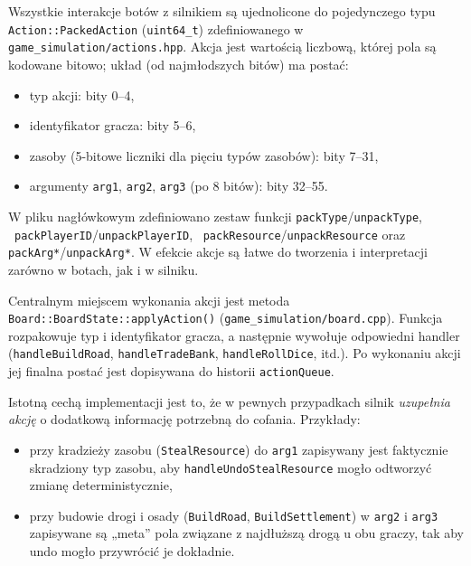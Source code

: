 \documentclass[polish,inz,longabstract]{iithesis}
\begin{document}
Wszystkie interakcje botów z silnikiem są ujednolicone do pojedynczego typu \texttt{Action::PackedAction} (\texttt{uint64\_t}) zdefiniowanego w \texttt{game\_simulation/actions.hpp}. Akcja jest wartością liczbową, której pola są kodowane bitowo; układ (od najmłodszych bitów) ma postać:

\begin{itemize}
\item typ akcji: bity 0–4,
\item identyfikator gracza: bity 5–6,
\item zasoby (5-bitowe liczniki dla pięciu typów zasobów): bity 7–31,
\item argumenty \texttt{arg1}, \texttt{arg2}, \texttt{arg3} (po 8 bitów): bity 32–55.
\end{itemize}

W pliku nagłówkowym zdefiniowano zestaw funkcji \texttt{packType}/\texttt{unpackType}, \ \newline \texttt{packPlayerID}/\texttt{unpackPlayerID}, \ \texttt{packResource}/\texttt{unpackResource} oraz \newline \texttt{packArg*}/\texttt{unpackArg*}. W efekcie akcje są łatwe do tworzenia i interpretacji zarówno w botach, jak i w silniku.

Centralnym miejscem wykonania akcji jest metoda \newline \texttt{Board::BoardState::applyAction()} (\texttt{game\_simulation/board.cpp}). Funkcja rozpakowuje typ i identyfikator gracza, a następnie wywołuje odpowiedni handler \newline (\texttt{handleBuildRoad}, \texttt{handleTradeBank}, \texttt{handleRollDice}, itd.). Po wykonaniu akcji jej finalna postać jest dopisywana do historii \texttt{actionQueue}.

Istotną cechą implementacji jest to, że w pewnych przypadkach silnik \textit{uzupełnia akcję} o dodatkową informację potrzebną do cofania. Przykłady:

\begin{itemize}
\item przy kradzieży zasobu (\texttt{StealResource}) do \texttt{arg1} zapisywany jest faktycznie skradziony typ zasobu, aby \texttt{handleUndoStealResource} mogło odtworzyć zmianę deterministycznie,
\item przy budowie drogi i osady (\texttt{BuildRoad}, \texttt{BuildSettlement}) w \texttt{arg2} i \texttt{arg3} zapisywane są „meta” pola związane z najdłuższą drogą u obu graczy, tak aby undo mogło przywrócić je dokładnie.
\end{itemize}
\end{document}

